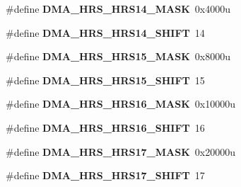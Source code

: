 \begin{DoxyCompactItemize}
\item 
\hypertarget{group___d_m_a___register___masks_ga70ee6df2c5cce431c6b9d3e3f958bd69}{}\#define {\bfseries D\+M\+A\+\_\+\+H\+R\+S\+\_\+\+H\+R\+S14\+\_\+\+M\+A\+S\+K}~0x4000u\label{group___d_m_a___register___masks_ga70ee6df2c5cce431c6b9d3e3f958bd69}

\item 
\hypertarget{group___d_m_a___register___masks_ga183e6503c7ed5e4b07f9df2bf47d46a9}{}\#define {\bfseries D\+M\+A\+\_\+\+H\+R\+S\+\_\+\+H\+R\+S14\+\_\+\+S\+H\+I\+F\+T}~14\label{group___d_m_a___register___masks_ga183e6503c7ed5e4b07f9df2bf47d46a9}

\item 
\hypertarget{group___d_m_a___register___masks_ga95ddced80fcb33b665fa1b6aad38210b}{}\#define {\bfseries D\+M\+A\+\_\+\+H\+R\+S\+\_\+\+H\+R\+S15\+\_\+\+M\+A\+S\+K}~0x8000u\label{group___d_m_a___register___masks_ga95ddced80fcb33b665fa1b6aad38210b}

\item 
\hypertarget{group___d_m_a___register___masks_gac91c063a84c76a6cf385cd3bda8f244a}{}\#define {\bfseries D\+M\+A\+\_\+\+H\+R\+S\+\_\+\+H\+R\+S15\+\_\+\+S\+H\+I\+F\+T}~15\label{group___d_m_a___register___masks_gac91c063a84c76a6cf385cd3bda8f244a}

\item 
\hypertarget{group___d_m_a___register___masks_gaf27cdd898398cd38539d7e257f93a17d}{}\#define {\bfseries D\+M\+A\+\_\+\+H\+R\+S\+\_\+\+H\+R\+S16\+\_\+\+M\+A\+S\+K}~0x10000u\label{group___d_m_a___register___masks_gaf27cdd898398cd38539d7e257f93a17d}

\item 
\hypertarget{group___d_m_a___register___masks_gabe91c2ca6b83138cbba572c98e510a56}{}\#define {\bfseries D\+M\+A\+\_\+\+H\+R\+S\+\_\+\+H\+R\+S16\+\_\+\+S\+H\+I\+F\+T}~16\label{group___d_m_a___register___masks_gabe91c2ca6b83138cbba572c98e510a56}

\item 
\hypertarget{group___d_m_a___register___masks_ga7c266fced78c2bb7a0e2840e6c9b0d10}{}\#define {\bfseries D\+M\+A\+\_\+\+H\+R\+S\+\_\+\+H\+R\+S17\+\_\+\+M\+A\+S\+K}~0x20000u\label{group___d_m_a___register___masks_ga7c266fced78c2bb7a0e2840e6c9b0d10}

\item 
\hypertarget{group___d_m_a___register___masks_ga8b858a03a2519dde16b6fc554c7d5886}{}\#define {\bfseries D\+M\+A\+\_\+\+H\+R\+S\+\_\+\+H\+R\+S17\+\_\+\+S\+H\+I\+F\+T}~17\label{group___d_m_a___register___masks_ga8b858a03a2519dde16b6fc554c7d5886}


\end{DoxyCompactItemize}
